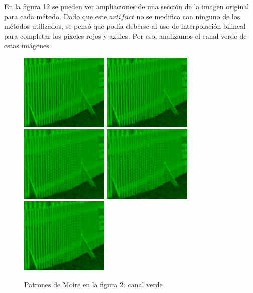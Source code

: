 \documentclass[a4paper]{article}
\begin{document}
En la figura 12 se pueden ver ampliaciones de una sección de la imagen original para cada método. 
Dado que este $artifact$ no se modifica con ninguno de los métodos utilizados, se pensó que podía deberse al uso de interpolación bilineal para completar los píxeles rojos y azules. Por eso, analizamos el canal verde de estas imágenes.

\begin{figure}[h!]
\centering
\includegraphics[width=120pt]{img/img8v-recortada.png}
\includegraphics[width=120pt]{img/img8-0v-recortada.png}
\includegraphics[width=120pt]{img/img8-1v-recortada.png}
\includegraphics[width=120pt]{img/img8-2v-recortada.png}
\includegraphics[width=120pt]{img/img8-3v-recortada.png}
\caption{Patrones de Moire en la figura 2: canal verde}
\end{figure}
\end{document}
